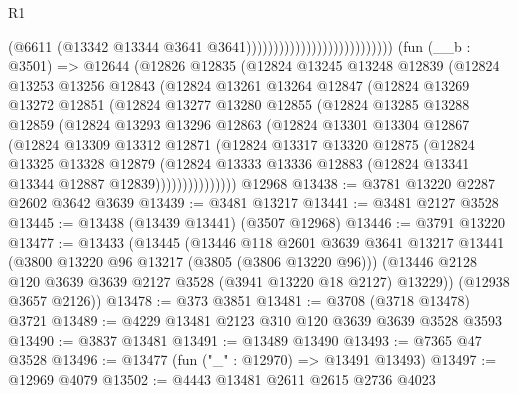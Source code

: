 \begin{lexlean}{R1}
\begin{coremodule}
                                                      (@6611
                                                        (@13342
                                                          @13344
                                                          @3641
                                                          @3641)))))))))))))))))))))))))))
    (fun (__b : @3501) =>
    @12644
      (@12826
        @12835
        (@12824
          @13245
          @13248
          @12839
          (@12824
            @13253
            @13256
            @12843
            (@12824
              @13261
              @13264
              @12847
              (@12824
                @13269
                @13272
                @12851
                (@12824
                  @13277
                  @13280
                  @12855
                  (@12824
                    @13285
                    @13288
                    @12859
                    (@12824
                      @13293
                      @13296
                      @12863
                      (@12824
                        @13301
                        @13304
                        @12867
                        (@12824
                          @13309
                          @13312
                          @12871
                          (@12824
                            @13317
                            @13320
                            @12875
                            (@12824
                              @13325
                              @13328
                              @12879
                              (@12824
                                @13333
                                @13336
                                @12883
                                (@12824 @13341 @13344 @12887 @12839)))))))))))))))
    @12968
@13438 := @3781 @13220 @2287 @2602 @3642 @3639
@13439 := @3481 @13217
@13441 := @3481 @2127 @3528
@13445 := @13438 (@13439 @13441) (@3507 @12968)
@13446 := @3791 @13220
@13477 := @13433
    (@13445
      (@13446
        @118
        @2601
        @3639
        @3641
        @13217
        @13441
        (@3800 @13220 @96 @13217 (@3805 (@3806 @13220 @96)))
        (@13446 @2128 @120 @3639 @3639 @2127 @3528 (@3941 @13220 @18 @2127) @13229))
      (@12938 @3657 @2126))
@13478 := @373 @3851
@13481 := @3708 (@3718 @13478) @3721
@13489 := @4229 @13481 @2123 @310 @120 @3639 @3639 @3528 @3593
@13490 := @3837 @13481
@13491 := @13489 @13490
@13493 := @7365 @47 @3528
@13496 := @13477 (fun ("_" : @12970) => @13491 @13493)
@13497 := @12969 @4079
@13502 := @4443 @13481 @2611 @2615 @2736 @4023

\end{coremodule}
\end{lexlean}
